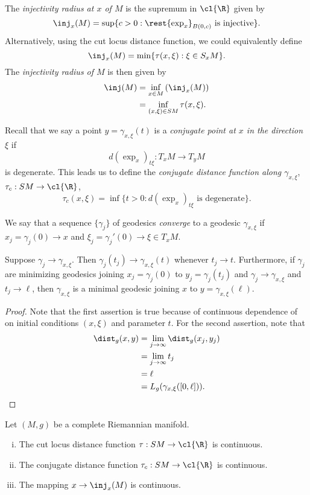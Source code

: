 The \textit{injectivity radius at $x$ of $M$} is the supremum in $\cl{\R}$ given by
$$\inj_x(M)=\sup\{c>0:\rest{\exp_x}_{B(0,c)}\text{ is injective}\}.$$
Alternatively, using the cut locus distance function, we could equivalently define
$$\inj_x(M)=\min\{\tau(x,\xi):\xi\in S_xM\}.$$
The \textit{injectivity radius of $M$} is then given by
\begin{align*}
	\inj(M)&=\inf_{x\in M}\left(\inj_x(M)\right)\\
	&=\inf_{(x,\xi)\in SM}\tau(x,\xi).
\end{align*}


Recall that we say a point $y=\gamma_{x,\xi}(t)$ is a \textit{conjugate point at $x$ in the direction $\xi$} if 
$$d(\exp_x)_{t\xi}:T_xM\to T_yM$$
is degenerate.  This leads us to define the \textit{conjugate distance function along $\gamma_{x,\xi}$}, $\tau_c:SM\to\cl{\R}$,
$$\tau_c(x,\xi)=\inf\{t>0:d(\exp_x)_{t\xi}\text{ is degenerate}\}.$$


We say that a sequence $\{\gamma_j\}$ of geodesics \textit{converge} to a geodesic $\gamma_{x,\xi}$ if $x_j=\gamma_j(0)\to x$ and $\xi_j=\gamma_j'(0)\to \xi\in T_xM$.

\begin{lem}
    Suppose $\gamma_j\to\gamma_{x,\xi}$.  Then $\gamma_j(t_j)\to\gamma_{x,\xi}(t)$ whenever $t_j\to t$.  Furthermore, if $\gamma_j$ are minimizing geodesics joining $x_j=\gamma_j(0)$ to $y_j=\gamma_j(t_j)$ and $\gamma_j\to\gamma_{x,\xi}$ and $t_j\to \ell$, then $\gamma_{x,\xi}$ is a minimal geodesic joining $x$ to $y=\gamma_{x,\xi}(\ell)$.
\end{lem}

\begin{proof}
Note that the first assertion is true because of continuous dependence of on initial conditions $(x,\xi)$ and parameter $t$.  For the second assertion, note that
\begin{align*}
	\dist_g(x,y)&=\lim_{j\to\infty}\dist_g(x_j,y_j)\\
	&=\lim_{j\to\infty}t_j\\
	&=\ell\\
	&=L_g(\gamma_{x,\xi}([0,\ell])).
\end{align*}
\end{proof}


\begin{lem}
Let $(M,g)$ be a complete Riemannian manifold.
\begin{enumerate}[i.]
    \item The cut locus distance function $\tau:SM\to\cl{\R}$ is continuous.
    \item The conjugate distance function $\tau_c:SM\to\cl{\R}$ is continuous.
    \item The mapping $x\to\inj_x(M)$ is continuous.
\end{enumerate}
\end{lem}


